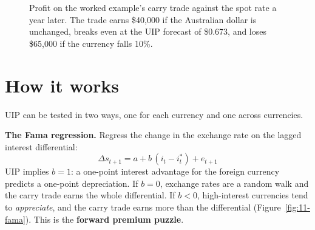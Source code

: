 \begin{figure}[htbp]
\centering
{}
\caption{Profit on the worked example's carry trade against the spot rate a year later. The trade earns \$40,000 if the Australian dollar is unchanged, breaks even at the UIP forecast of \$0.673, and loses \$65,000 if the currency falls 10\%.}
\label{fig:11-carry}
\end{figure}

\section{How it works}
\label{sec:11-how}

UIP can be tested in two ways, one for each currency and one across currencies.

\textbf{The Fama regression.} Regress the change in the exchange rate on the lagged interest differential:
\begin{equation}
  \Delta s_{t+1} = a + b\,(i_t - i^*_t) + e_{t+1}
  \label{eq:11-fama}
\end{equation}
UIP implies $b = 1$: a one-point interest advantage for the foreign currency predicts a one-point depreciation. If $b = 0$, exchange rates are a random walk and the carry trade earns the whole differential. If $b < 0$, high-interest currencies tend to \emph{appreciate}, and the carry trade earns more than the differential (Figure~\ref{fig:11-fama}). This is the \textbf{forward premium puzzle}.


